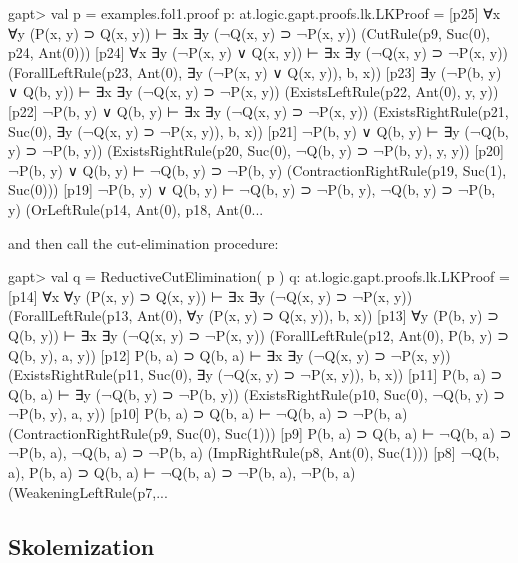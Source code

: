 \documentclass[a4paper,11pt]{article}
\begin{document}
\begin{clilisting}
gapt> val p = examples.fol1.proof
p: at.logic.gapt.proofs.lk.LKProof =
[p25] ∀x ∀y (P(x, y) ⊃ Q(x, y)) ⊢ ∃x ∃y (¬Q(x, y) ⊃ ¬P(x, y))    (CutRule(p9, Suc(0), p24, Ant(0)))
[p24] ∀x ∃y (¬P(x, y) ∨ Q(x, y)) ⊢ ∃x ∃y (¬Q(x, y) ⊃ ¬P(x, y))    (ForallLeftRule(p23, Ant(0), ∃y (¬P(x, y) ∨ Q(x, y)), b, x))
[p23] ∃y (¬P(b, y) ∨ Q(b, y)) ⊢ ∃x ∃y (¬Q(x, y) ⊃ ¬P(x, y))    (ExistsLeftRule(p22, Ant(0), y, y))
[p22] ¬P(b, y) ∨ Q(b, y) ⊢ ∃x ∃y (¬Q(x, y) ⊃ ¬P(x, y))    (ExistsRightRule(p21, Suc(0), ∃y (¬Q(x, y) ⊃ ¬P(x, y)), b, x))
[p21] ¬P(b, y) ∨ Q(b, y) ⊢ ∃y (¬Q(b, y) ⊃ ¬P(b, y))    (ExistsRightRule(p20, Suc(0), ¬Q(b, y) ⊃ ¬P(b, y), y, y))
[p20] ¬P(b, y) ∨ Q(b, y) ⊢ ¬Q(b, y) ⊃ ¬P(b, y)    (ContractionRightRule(p19, Suc(1), Suc(0)))
[p19] ¬P(b, y) ∨ Q(b, y) ⊢ ¬Q(b, y) ⊃ ¬P(b, y), ¬Q(b, y) ⊃ ¬P(b, y)    (OrLeftRule(p14, Ant(0), p18, Ant(0...
\end{clilisting}
%
and then call the cut-elimination procedure:
\begin{clilisting}
gapt> val q = ReductiveCutElimination( p )
q: at.logic.gapt.proofs.lk.LKProof =
[p14] ∀x ∀y (P(x, y) ⊃ Q(x, y)) ⊢ ∃x ∃y (¬Q(x, y) ⊃ ¬P(x, y))    (ForallLeftRule(p13, Ant(0), ∀y (P(x, y) ⊃ Q(x, y)), b, x))
[p13] ∀y (P(b, y) ⊃ Q(b, y)) ⊢ ∃x ∃y (¬Q(x, y) ⊃ ¬P(x, y))    (ForallLeftRule(p12, Ant(0), P(b, y) ⊃ Q(b, y), a, y))
[p12] P(b, a) ⊃ Q(b, a) ⊢ ∃x ∃y (¬Q(x, y) ⊃ ¬P(x, y))    (ExistsRightRule(p11, Suc(0), ∃y (¬Q(x, y) ⊃ ¬P(x, y)), b, x))
[p11] P(b, a) ⊃ Q(b, a) ⊢ ∃y (¬Q(b, y) ⊃ ¬P(b, y))    (ExistsRightRule(p10, Suc(0), ¬Q(b, y) ⊃ ¬P(b, y), a, y))
[p10] P(b, a) ⊃ Q(b, a) ⊢ ¬Q(b, a) ⊃ ¬P(b, a)    (ContractionRightRule(p9, Suc(0), Suc(1)))
[p9] P(b, a) ⊃ Q(b, a) ⊢ ¬Q(b, a) ⊃ ¬P(b, a), ¬Q(b, a) ⊃ ¬P(b, a)    (ImpRightRule(p8, Ant(0), Suc(1)))
[p8] ¬Q(b, a), P(b, a) ⊃ Q(b, a) ⊢ ¬Q(b, a) ⊃ ¬P(b, a), ¬P(b, a)    (WeakeningLeftRule(p7,...
\end{clilisting}


\subsection{Skolemization}
\end{document}
